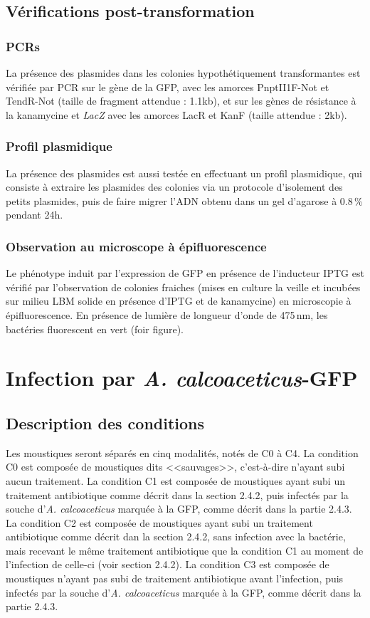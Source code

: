 \subsection{Vérifications post-transformation}

\subsubsection{PCRs}
La présence des plasmides dans les colonies hypothétiquement transformantes est vérifiée par PCR sur le gène de la GFP, avec les amorces PnptII1F-Not et TendR-Not (taille de fragment attendue : 1.1kb), et sur les gènes de résistance à la kanamycine et \textit{LacZ} avec les amorces LacR et KanF (taille attendue : 2kb).

\subsubsection{Profil plasmidique}
La présence des plasmides est aussi testée en effectuant un profil plasmidique, qui consiste à extraire les plasmides des colonies via un protocole d'isolement des petits plasmides, puis de faire migrer l'ADN obtenu dans un gel d'agarose à 0.8\,\% pendant 24h.

\subsubsection{Observation au microscope à épifluorescence}
Le phénotype induit par l'expression de GFP en présence de l'inducteur IPTG est vérifié par l'observation de colonies fraiches (mises en culture la veille et incubées sur milieu LBM solide en présence d'IPTG et de kanamycine) en microscopie à épifluorescence.
En présence de lumière de longueur d'onde de 475\,nm, les bactéries fluorescent en vert (foir figure).

\section{Infection par \textit{A. calcoaceticus}-GFP}

\subsection{Description des conditions}

Les moustiques seront séparés en cinq modalités, notés de C0 à C4.
La condition C0 est composée de moustiques dits <<sauvages>>, c'est-à-dire n'ayant subi aucun traitement.
La condition C1 est composée de moustiques ayant subi un traitement antibiotique comme décrit dans la section 2.4.2, puis infectés par la souche d'\textit{A. calcoaceticus} marquée à la GFP, comme décrit dans la partie 2.4.3.
La condition C2 est composée de moustiques ayant subi un traitement antibiotique comme décrit dan la section 2.4.2, sans infection avec la bactérie, mais recevant le même traitement antibiotique que la condition C1 au moment de l'infection de celle-ci (voir section 2.4.2).
La condition C3 est composée de moustiques n'ayant pas subi de traitement antibiotique avant l'infection, puis infectés par la souche d'\textit{A. calcoaceticus} marquée à la GFP, comme décrit dans la partie 2.4.3.

